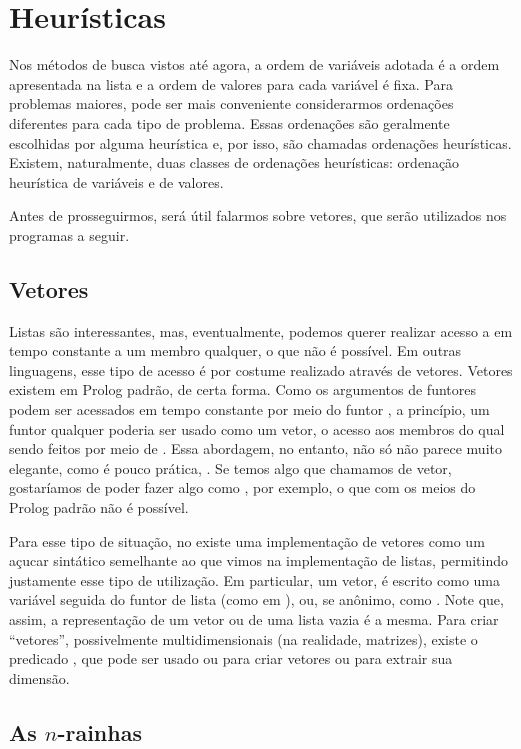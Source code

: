\documentclass{article}
\begin{document}
\section{Heurísticas}

Nos métodos de busca vistos até agora, a ordem de variáveis adotada é a ordem apresentada na lista
e a ordem de valores para cada variável é fixa. Para problemas maiores, pode ser mais conveniente
considerarmos ordenações diferentes para cada tipo de problema. Essas ordenações são geralmente
escolhidas por alguma heurística e, por isso, são chamadas ordenações heurísticas. Existem,
naturalmente, duas classes de ordenações heurísticas: ordenação heurística de variáveis e de
valores.

Antes de prosseguirmos, será útil falarmos sobre vetores, que serão utilizados nos programas a
seguir.

\subsection{Vetores}

Listas são interessantes, mas, eventualmente, podemos querer realizar acesso a em tempo constante a
um membro qualquer, o que não é possível. Em outras linguagens, esse tipo de acesso é por costume
realizado através de vetores. Vetores existem em Prolog padrão, de certa forma. Como os argumentos
de funtores podem ser acessados em tempo constante por meio do funtor , a princípio,
um funtor qualquer poderia ser usado como um vetor, o acesso aos membros do qual sendo feitos por meio de
. Essa abordagem, no entanto, não só não parece muito elegante, como é pouco prática, .
Se temos algo que chamamos de vetor, gostaríamos de poder fazer algo como , por
exemplo, o que com os meios do Prolog padrão não é possível.

Para esse tipo de situação, no \eclipse existe uma implementação de vetores como um açucar
sintático semelhante ao que vimos na implementação de listas, permitindo justamente esse tipo de
utilização. Em particular, um vetor, é escrito como uma variável seguida do funtor de lista (como
em ), ou, se anônimo, como . Note que, assim, a representação de
um vetor ou de uma lista vazia é a mesma. Para criar ``vetores'', possivelmente multidimensionais
(na realidade, matrizes), existe o predicado , que pode ser usado ou para criar vetores
ou para extrair sua dimensão.

\subsection{As $n$-rainhas}
\end{document}

